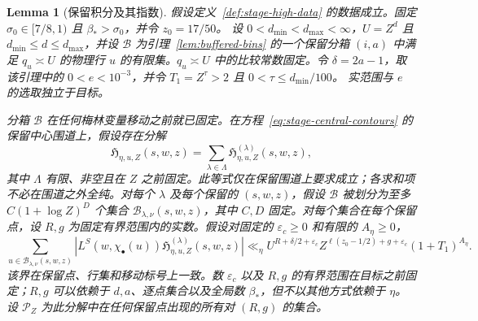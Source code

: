 \documentclass[11pt,a4paper]{article}
\numberwithin{equation}{section}
\numberwithin{figure}{section}
\newtheorem{lemma}[theorem]{Lemma}
\theoremstyle{definition}
\theoremstyle{remark}
\begin{document}
\begin{lemma}[保留积分及其指数]
\label{lem:bin-contour-accounting}
假设定义~\ref{def:stage-high-data} 的数据成立。固定
$\sigma_0\in[7/8,1)$ 且 $\beta_*>\sigma_0$，并令 $z_0=17/50$。
设 $0<d_{\min}<d_{\max}<\infty$，$U=Z^d$ 且
$d_{\min}\le d\le d_{\max}$，并设 $\mathcal B$ 为引理~\ref{lem:buffered-bins} 的一个保留分箱 $(i,a)$ 中满足 $q_u\asymp U$ 的物理行 $u$ 的有限集。$q_u\asymp U$ 中的比较常数固定。令 $\delta=2a-1$，取该引理中的 $0<e<10^{-3}$，并令 $T_1=Z^\tau>2$ 且 $0<\tau\le d_{\min}/100$。
实范围与 $e$ 的选取独立于目标。

分箱 $\mathcal B$ 在任何梅林变量移动之前就已固定。在方程~\eqref{eq:stage-central-contours} 的保留中心围道上，假设存在分解
\[
 \mathfrak H_{\eta,u,Z}(s,w,z)
       =\sum_{\lambda\in\Lambda}
             \mathfrak H^{(\lambda)}_{\eta,u,Z}(s,w,z),
\]
其中 $\Lambda$ 有限、非空且在 $Z$ 之前固定。此等式仅在保留围道上要求成立；各求和项不必在围道之外全纯。对每个 $\lambda$ 及每个保留的 $(s,w,z)$，假设 $\mathcal B$ 被划分为至多 $C(1+\log Z)^D$ 个集合
$\mathcal B_{\lambda,\nu}(s,w,z)$，其中 $C,D$ 固定。对每个集合在每个保留点，设 $R,g$ 为固定有界范围内的实数。假设对固定的
$\varepsilon_c\ge0$ 和有限的 $A_\eta\ge0$，
\begin{equation}
 \sum_{u\in\mathcal B_{\lambda,\nu}(s,w,z)}
  \left|L^S(w,\chi_\bullet(u))
       \mathfrak H^{(\lambda)}_{\eta,u,Z}(s,w,z)\right|
 \ll_\eta U^{R+\delta/2+\varepsilon_c}
 Z^{\ell(z_0-1/2)+g+\varepsilon_c}(1+T_1)^{A_\eta}.
 \label{eq:stage-central-bound}
\end{equation}
该界在保留点、行集和移动标号上一致。数 $\varepsilon_c$ 以及 $R,g$ 的有界范围在目标之前固定；$R,g$ 可以依赖于 $d,a$、逐点集合以及全局数 $\beta_*$，但不以其他方式依赖于 $\eta$。设 $\mathcal P_Z$ 为此分解中在任何保留点出现的所有对 $(R,g)$ 的集合。


\end{lemma}
\end{document}
